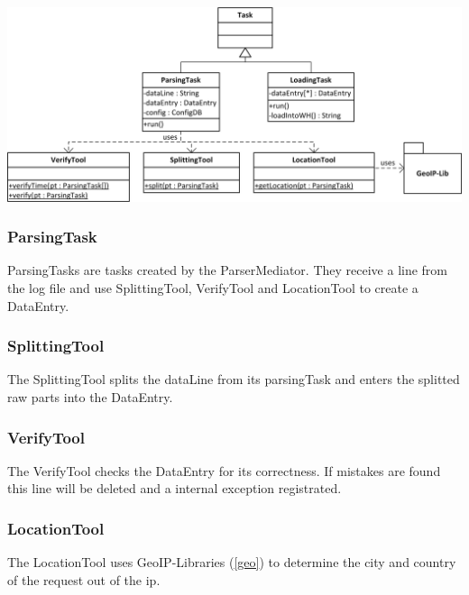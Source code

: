 

\newpage
\begin{center}
\includegraphics[width=1\linewidth]{Pictures/Parts/TaskTool.png}
\end{center}

\subsubsection*{ParsingTask}
ParsingTasks are tasks created by the ParserMediator. They receive a line from the log file and use  
SplittingTool, VerifyTool and LocationTool to create a DataEntry. 


\subsubsection*{SplittingTool}
The SplittingTool splits the dataLine from its parsingTask and enters the splitted raw parts into the DataEntry.

\subsubsection*{VerifyTool}
The VerifyTool checks the DataEntry for its correctness. %
If mistakes are found this line will be deleted and a internal exception registrated. 

\subsubsection*{LocationTool}
The LocationTool uses GeoIP-Libraries (\ref{geo}) to determine the city and country of the request out of the ip.

